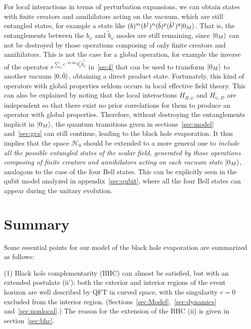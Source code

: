 \documentclass[12pt,a4paper]{article}
\begin{document}
For local interactions in terms of perturbation expansions, we can obtain states with finite creators and annihilators acting on the vacuum, which are still entangled states, for example a state like $(b)^m(b^{\dag})^n(\tilde{b})^p(\tilde{b}^{\dag})^q\arrowvert0_M\rangle$. That is, the entanglements between the $b_{\omega}$ and $\tilde{b}_{\omega}$ modes are still remaining, since $\arrowvert0_{M}\rangle$ can not be destroyed by those operations composing of only finite creators and annihilators. This is not the case for a global operation, for example the inverse of the operator $e^{\sum_{\omega}e^{-4\pi M\omega}b_{\omega}^{\dag}\tilde{b}_{\omega}^{\dag}}$ in~\eqref{eq:4} that can be used to transform $\arrowvert0_{M}\rangle$ to another vacuum $\arrowvert0,\tilde{0}\rangle$, obtaining a direct product state. Fortunately, this kind of operators with global properties seldom occurs in local effective field theory. This can also be explained by noting that the local interactions $H_{B,\psi}$ and $H_{\psi,D}$ are independent so that there exist no prior correlations for them to produce an operator with global properties. Therefore, without destroying the entanglements implicit in $\arrowvert0_{M}\rangle$, the quantum transitions given in sections~\ref{sec:model} and~\ref{sec:gra} can still continue, leading to the black hole
evaporation. It thus implies that the space $\mathcal {H}_0$ should be extended to a more general one to \emph{include all the possible entangled states of the scalar field, generated by those operations composing of finite creators and annihilators acting on each vacuum state $\arrowvert0_{M}\rangle$}, analogous to the case of the four Bell states. This can be explicitly seen in the qubit model analyzed in appendix~\ref{sec:qubit}, where all the four Bell states can appear during the unitary evolution.

\section{Summary}
\label{sec:sum}

Some essential points for our model of the black hole evaporation are summarized as follows:

(1) Black hole complementarity (BHC) can almost be satisfied, but with an extended postulate (ii'): both the exterior and interior regions of the event horizon are well described by QFT in curved space, with the singularity $r=0$ excluded from the interior region. (Sections~\ref{sec:Model},~\ref{sec:dynamics} and~\ref{sec:nonlocal}.) The reason for the extension of the BHC (ii) is given in section~\ref{sec:bhc}.
\end{document}
